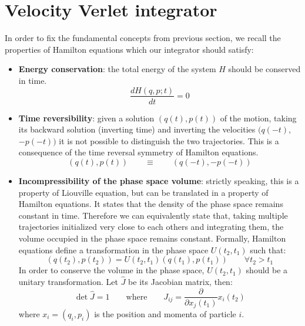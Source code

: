     \section{Velocity Verlet integrator} \label{sec:velocity_verlet}
        In order to fix the fundamental concepts from previous section, we recall the properties of Hamilton equations which our integrator should satisfy:
        \begin{itemize}
            \item \textbf{Energy conservation}: the total energy of the system $H$ should be conserved in time.
            \begin{equation}
                \frac{dH(q,p;t)}{dt}=0
            \end{equation}
            \item \textbf{Time reversibility}: given a solution $(q(t),p(t))$ of the motion, taking its backward solution (inverting time) and inverting the velocities $(q(-t),$ $-p(-t))$ it is not possible to distinguish the two trajectories. This is a consequence of the time reversal symmetry of Hamilton equations.
            \begin{equation}
                (q(t),p(t))\qquad \equiv \qquad (q(-t),-p(-t))
            \end{equation}
            \item \textbf{Incompressibility of the phase space volume}: strictly speaking, this is a property of Liouville equation, but can be translated in a property of Hamilton equations. It states that the density of the phase space remains constant in time. Therefore we can equivalently state that, taking multiple trajectories initialized very close to each others and integrating them, the volume occupied in the phase space remains constant. Formally, Hamilton equations define a transformation in the phase space $U(t_2,t_1)$ such that:
            \begin{equation}
                (q(t_2),p(t_2))=U(t_2,t_1)(q(t_1),p(t_1)) \qquad \forall t_2>t_1
            \end{equation}
            In order to conserve the volume in the phase space, $U(t_2,t_1)$ should be a unitary transformation. Let $\hat{J}$ be its Jacobian matrix, then:
            \begin{equation}
                \det \hat{J}=1 \qquad \text{where} \qquad J_{ij}=\frac{\partial}{\partial x_j(t_1)}x_i(t_2)
            \end{equation}
            where $x_i=(q_i,p_i)$ is the position and momenta of particle $i$.
        \end{itemize}
            

